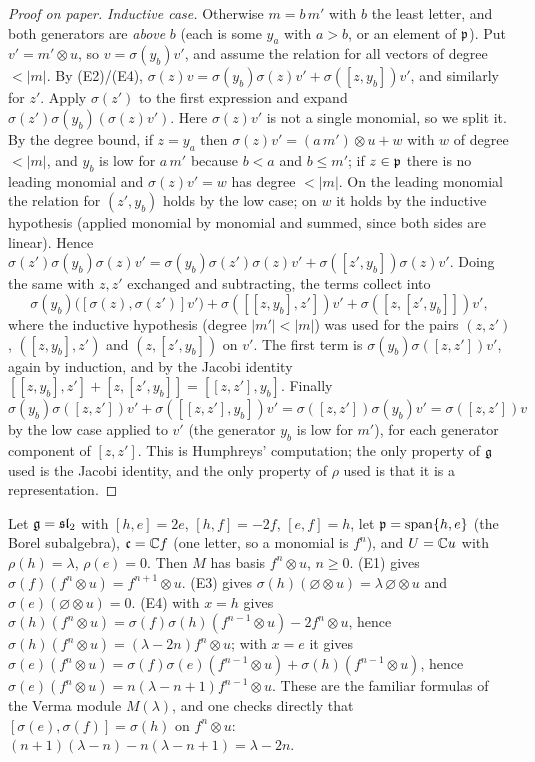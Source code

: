 \begin{proof}[Proof on paper]
\emph{Inductive case.} Otherwise $m = b\,m'$ with $b$ the least letter, and both generators are
\emph{above} $b$ (each is some $y_a$ with $a>b$, or an element of $\mathfrak{p}$). Put $v' = m'\otimes u$, so
$v = \sigma(y_b)v'$, and assume the relation for all vectors of degree $<|m|$. By (E2)/(E4),
$\sigma(z)v = \sigma(y_b)\sigma(z)v' + \sigma([z,y_b])v'$, and similarly for $z'$. Apply $\sigma(z')$ to the
first expression and expand $\sigma(z')\sigma(y_b)(\sigma(z)v')$. Here $\sigma(z)v'$ is not a single monomial,
so we split it. By the degree bound, if $z = y_a$ then $\sigma(z)v' = (a\,m')\otimes u + w$ with $w$ of degree
$<|m|$, and $y_b$ is low for $a\,m'$ because $b<a$ and $b\le m'$; if $z\in\mathfrak{p}$ there is no leading monomial
and $\sigma(z)v' = w$ has degree $<|m|$. On the leading monomial the relation for $(z',y_b)$ holds by the
low case; on $w$ it holds by the inductive hypothesis (applied monomial by monomial and summed, since both
sides are linear). Hence $\sigma(z')\sigma(y_b)\sigma(z)v' = \sigma(y_b)\sigma(z')\sigma(z)v' +
\sigma([z',y_b])\sigma(z)v'$. Doing the same
with $z,z'$ exchanged and subtracting, the terms collect into
\begin{equation*}
 \sigma(y_b)\bigl([\sigma(z),\sigma(z')]v'\bigr) + \sigma([[z,y_b],z'])v' + \sigma([z,[z',y_b]])v',
\end{equation*}
where the inductive hypothesis (degree $|m'| < |m|$) was used for the pairs $(z,z')$, $([z,y_b],z')$ and
$(z,[z',y_b])$ on $v'$. The first term is $\sigma(y_b)\sigma([z,z'])v'$, again by induction, and by the Jacobi
identity $[[z,y_b],z'] + [z,[z',y_b]] = [[z,z'],y_b]$. Finally
$\sigma(y_b)\sigma([z,z'])v' + \sigma([[z,z'],y_b])v' = \sigma([z,z'])\sigma(y_b)v' = \sigma([z,z'])v$ by the low case
applied to $v'$ (the generator $y_b$ is low for $m'$), for each generator component of $[z,z']$. This is
Humphreys' computation; the only property of $\mathfrak{g}$ used is the Jacobi identity, and the only property of
$\rho$ used is that it is a representation.
\end{proof}

\begin{example}\label{l02:ex:relrep}
Let $\mathfrak{g} = \mathfrak{sl}_2$ with $[h,e] = 2e$, $[h,f] = -2f$, $[e,f] = h$, let $\mathfrak{p} = \operatorname{span}\{h,e\}$
(the Borel subalgebra), $\mathfrak c = {\mathbb{C}} f$ (one letter, so a monomial is $f^n$), and $U = {\mathbb{C}} u$ with
$\rho(h) = \lambda$, $\rho(e) = 0$. Then $M$ has basis $f^n\otimes u$, $n\ge0$. (E1) gives
$\sigma(f)(f^n\otimes u) = f^{n+1}\otimes u$. (E3) gives $\sigma(h)(\varnothing\otimes u) = \lambda\,\varnothing\otimes u$ and
$\sigma(e)(\varnothing\otimes u) = 0$. (E4) with $x = h$ gives
$\sigma(h)(f^n\otimes u) = \sigma(f)\sigma(h)(f^{n-1}\otimes u) - 2f^n\otimes u$, hence $\sigma(h)(f^n\otimes u) =
(\lambda-2n)f^n\otimes u$; with $x = e$ it gives $\sigma(e)(f^n\otimes u) = \sigma(f)\sigma(e)(f^{n-1}\otimes u) +
\sigma(h)(f^{n-1}\otimes u)$, hence $\sigma(e)(f^n\otimes u) = n(\lambda-n+1)f^{n-1}\otimes u$. These are the familiar
formulas of the Verma module $M(\lambda)$, and one checks directly that
$[\sigma(e),\sigma(f)] = \sigma(h)$ on $f^n\otimes u$: $(n+1)(\lambda-n) - n(\lambda-n+1) = \lambda-2n$.
\end{example}

